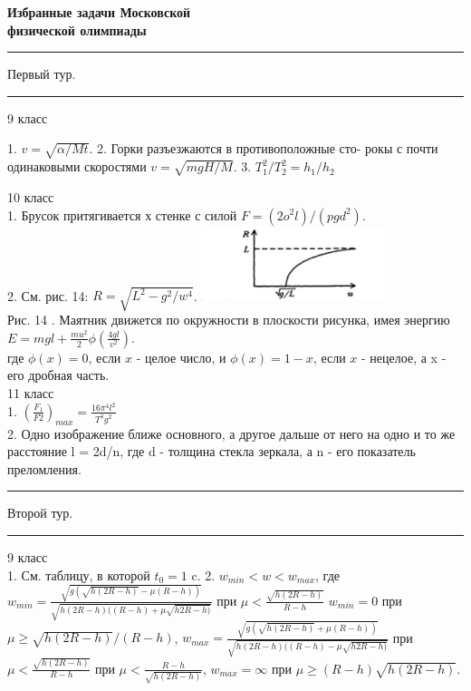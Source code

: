 \documentclass[8pt, letterpaper]{article}
\begin{document}
\begin{multicols}{2}
\textbf {\normalsize Избранные задачи Московской \\
 физической олимпиады}
\\
\vspace{5pt}
\hrule
\vspace{2pt}
Первый тур.\\
\vspace{1pt}
\hrule
\vspace{5pt}
9 класс

1. $v=\sqrt{\alpha/Mt}$. 2. Горки разъезжаются в противоположные сто-
рокы с почти одинаковыми скоростями $v=\sqrt{mgH/M}$.
3. $T_{1}^2/T_{2}^2=h_{1}/h_{2}$

10 класс\\
1. Брусок притягивается х стенке с силой $F = (2o^2l)/(pgd^2)$.
\columnbreak
\\
2. См. рис. 14: $R=\sqrt{L^2-g^2/w^4}$.
\flushleft
\includegraphics [width=0.4\textwidth]{Screenshot_2.png} \\ \centering Рис. 14
\label{fig:mpr}
. Маятник движется по окружности в плоскости рисунка, имея энергию\\
$E=mgl+\frac{mu^2}{2}\phi(\frac{4gl}{v^2})$.\\
где $\phi(x)=0$, если $x$ - целое число, и $\phi(x)=1 - {x}$, если $x$ - нецелое, а {x} - его дробная часть.\\
11 класс\\
1. $(\frac{F_{1}}{F2})_{max} = \frac{16\pi^4l^2}{T^4g^2}$\\
2. Одно изображение ближе основного, а другое дальше от него на одно и то же расстояние l = 2d/n, где d - толщина стекла зеркала, а n - его показатель преломления.
\vspace{5pt}
\hrule
\vspace{-2pt}
Второй тур.\\
\vspace{7pt}
\hrule
\vspace{5pt}
9 класс\\
1. См. таблицу, в которой $t_{0} = 1$ c.
2. $w_{min} < w < w_{max}$, где\\
$w_{min} = \frac{\sqrt{g(\sqrt{h(2R-h)}-\mu(R-h))}}{\sqrt{h(2R-h)((R-h)+\mu\sqrt{h{2R-h)}}}}$ при $\mu < \frac{\sqrt{h(2R-h)}}{R-h}$
$w_{min} = 0$ при $\mu \geq \sqrt{h(2R-h)}/(R-h)$,
$w_{max} = \frac{\sqrt{g(\sqrt{h(2R-h)}+\mu(R-h))}}{\sqrt{h(2R-h)((R-h)-\mu\sqrt{h{2R-h)}}}}$ при $\mu < \frac{\sqrt{h(2R-h)}}{R-h}$ при $\mu < \frac{R-h}{\sqrt{h(2R-h)}}$,
$w_{max} = \infty$ при $\mu \geq (R-h)\sqrt{h(2R-h)}$.
\end{multicols}
\end{document}
